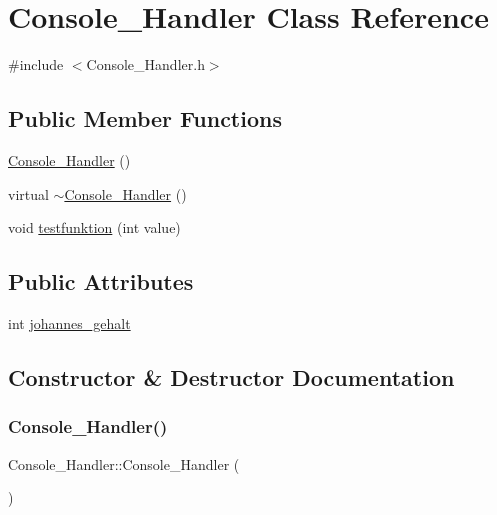 \hypertarget{class_console___handler}{}\section{Console\+\_\+\+Handler Class Reference}
\label{class_console___handler}


{\ttfamily \#include $<$Console\+\_\+\+Handler.\+h$>$}

\subsection*{Public Member Functions}
\begin{DoxyCompactItemize}
\item 
\mbox{\hyperlink{class_console___handler_a2bb80d1e1c03134cd46977bed0bc43e9}{Console\+\_\+\+Handler}} ()
\item 
virtual \mbox{\hyperlink{class_console___handler_aa62cfac38d9051824f44b7b71c65e2e4}{$\sim$\+Console\+\_\+\+Handler}} ()
\item 
void \mbox{\hyperlink{class_console___handler_a65e35994c0241d259c24f55069009c85}{testfunktion}} (int value)
\end{DoxyCompactItemize}
\subsection*{Public Attributes}
\begin{DoxyCompactItemize}
\item 
int \mbox{\hyperlink{class_console___handler_a0eaa4ec0555fb4274d2113dd6cbc209f}{johannes\+\_\+gehalt}}
\end{DoxyCompactItemize}


\subsection{Constructor \& Destructor Documentation}
\mbox{\label{class_console___handler_a2bb80d1e1c03134cd46977bed0bc43e9}} 
\subsubsection{\texorpdfstring{Console\+\_\+\+Handler()}{Console\_Handler()}}
{\footnotesize\ttfamily Console\+\_\+\+Handler\+::\+Console\+\_\+\+Handler (\begin{DoxyParamCaption}{ }\end{DoxyParamCaption})}

